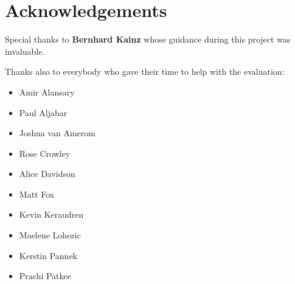\chapter*{Acknowledgements}

Special thanks to \textbf{Bernhard Kainz} whose guidance during this project was invaluable.

Thanks also to everybody who gave their time to help with the evaluation:

\begin{itemize}
	\item Amir Alansary
	\item Paul Aljabar
	\item Joshua van Amerom
	\item Rose Crowley
	\item Alice Davidson
	\item Matt Fox
	\item Kevin Keraudren
	\item Maelene Lohezic
	\item Kerstin Pannek
	\item Prachi Patkee
\end{itemize}